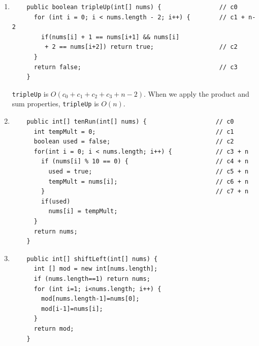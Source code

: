 \documentclass[a4paper,12pt]{article}
\begin{document}
\begin{enumerate}
    \item \begin{Verbatim}
    public boolean tripleUp(int[] nums) {                // c0
      for (int i = 0; i < nums.length - 2; i++) {        // c1 + n-2
        if(nums[i] + 1 == nums[i+1] && nums[i]
         + 2 == nums[i+2]) return true;                  // c2
      }
      return false;                                      // c3
    }
    \end{Verbatim}
    \texttt{tripleUp} is $O(c_0+c_1+c_2+c_3+n-2)$. When we apply the product
    and sum properties, \texttt{tripleUp} is $O(n)$.

    \item \begin{Verbatim}
    public int[] tenRun(int[] nums) {                   // c0
      int tempMult = 0;                                 // c1
      boolean used = false;                             // c2
      for(int i = 0; i < nums.length; i++) {            // c3 + n
        if (nums[i] % 10 == 0) {                        // c4 + n
          used = true;                                  // c5 + n
          tempMult = nums[i];                           // c6 + n
        }                                               // c7 + n
        if(used)                                        
          nums[i] = tempMult;
      }
      return nums;
    }
    \end{Verbatim}

    \item \begin{Verbatim}
    public int[] shiftLeft(int[] nums) {
      int [] mod = new int[nums.length];
      if (nums.length==1) return nums;
      for (int i=1; i<nums.length; i++) {
        mod[nums.length-1]=nums[0];
        mod[i-1]=nums[i];
      }
      return mod;
    }
    \end{Verbatim}
    \end{enumerate}
\end{document}
